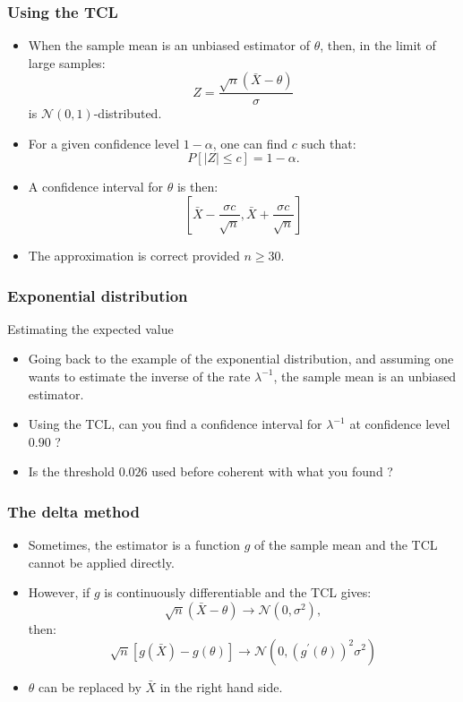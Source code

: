 \documentclass[main.tex]{subfiles}
\begin{document}
\begin{frame}
    \frametitle{Using the TCL}
\begin{itemize}
    \item<+-> When the sample mean is an unbiased estimator of $\theta$, then, in the limit of large samples:
    \begin{equation}
        Z = \frac{\sqrt{n}\left( \bar{X} - \theta \right)}{\sigma}
    \end{equation}
    is $\mathcal{N}(0,1)$-distributed.
    \item<+-> For a given confidence level $1-\alpha$, one can find $c$ such that:
    \begin{equation}
        P\left[ \lvert Z \rvert \leq c \right] = 1-\alpha.
    \end{equation}
    \item<+-> A confidence interval for $\theta$ is then:
    \begin{equation}
        \left[ \bar{X} - \frac{\sigma c}{\sqrt{n}}, \bar{X} + \frac{\sigma c}{\sqrt{n}}\right]
    \end{equation}
    \item<+-> The approximation is correct provided $n \geq 30.$
\end{itemize}
\end{frame}
\begin{frame}
    \frametitle{Exponential distribution}
\begin{block}{Estimating the expected value}
    \begin{itemize}
        \item<+-> Going back to the example of the exponential distribution, and assuming one wants to 
        estimate the inverse of the rate $\lambda^{-1}$, the sample mean is an unbiased estimator.
        \item<+-> Using the TCL, can you find a confidence interval for $\lambda^{-1}$ at confidence level $0.90$ ?
        \item<+-> Is the threshold $0.026$ used before coherent with what you found ?
    \end{itemize}
\end{block}
\end{frame}
\begin{frame}
    \frametitle{The delta method}
\begin{itemize}
    \item<+-> Sometimes, the estimator is a function $g$ of the sample mean and the TCL cannot be applied directly.
    \item<+-> However, if $g$ is continuously differentiable and the TCL gives:
    \begin{equation}
        \sqrt{n}\left( \bar{X}  -  \theta \right) \to \mathcal{N}(0,\sigma^2),
    \end{equation}
    then:
    \begin{equation}
        \sqrt{n}\left[ g\left( \bar{X} \right) - g(\theta) \right] \to \mathcal{N}\left( 0, \left(g^\prime(\theta)\right)^2 \sigma^2 \right)
    \end{equation}
    \item<+-> $\theta$ can be replaced by $\bar{X}$ in the right hand side.
\end{itemize}
\end{frame}
\end{document}
